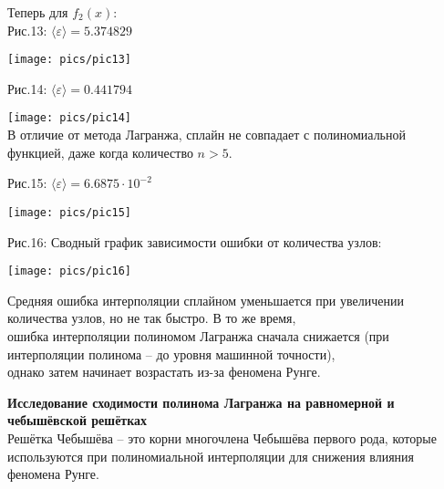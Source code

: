 \documentclass[a4paper, 14pt]{article}
\begin{document}
{\newpage
Теперь для $f_2(x)$:\\[-0.5cm]
{\normalsize Рис.13: $\langle\varepsilon\rangle = 5.374829$}
\begin{center}
        \texttt{[image: pics/pic13]}\\
\end{center}
\vspace{-0.7cm}
{\normalsize Рис.14: $\langle\varepsilon\rangle = 0.441794$}
\begin{center}
    \texttt{[image: pics/pic14]}\\
     \vspace{-0.7cm}
      {\small В отличие от метода Лагранжа, сплайн не совпадает с полиномиальной функцией, даже когда количество $n>5$.}
\end{center}
\newpage


{\normalsize Рис.15: $\langle\varepsilon\rangle = 6.6875\cdot10^{-2}$}
\begin{center}
    \texttt{[image: pics/pic15]}\\
    \vspace{-0.7cm}
\end{center}

{\normalsize Рис.16: Сводный график зависимости ошибки от количества узлов:}
\begin{center}
    \texttt{[image: pics/pic16]}\\
\end{center}
\vspace{-1cm}
{\small Средняя ошибка интерполяции сплайном уменьшается при увеличении количества узлов, но не так быстро. В то же время,\\[-0.5cm]
ошибка интерполяции полиномом Лагранжа сначала снижается (при интерполяции полинома -- до уровня машинной точности),\\[-0.5cm]
однако затем начинает возрастать из-за феномена Рунге.}


\newpage
{\huge{\textbf{Исследование сходимости полинома Лагранжа на равномерной и чебышёвской решётках}}}\\
Решётка Чебышёва -- это корни многочлена Чебышёва первого рода, которые используются при полиномиальной интерполяции для снижения влияния феномена Рунге.

}
\end{document}
